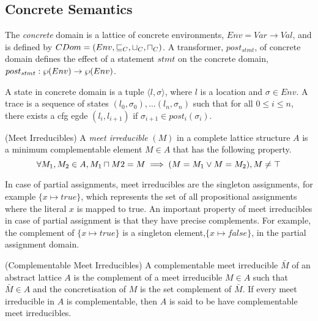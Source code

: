 \subsection{Concrete Semantics}
The {\em concrete} domain is a lattice 
of concrete environments, $Env = Var \rightarrow Val$, and is 
defined by $CDom = (Env, \sqsubseteq_{C}, \sqcup_{C}, \sqcap_{C})$.
A transformer, $post_{stmt}$, of concrete domain defines 
the effect of a statement $stmt$ on the concrete domain, 
$post_{stmt} : \wp(Env) \rightarrow \wp(Env)$.  

A state in concrete domain is a tuple $\langle l, \sigma \rangle$, 
where $l$ is a location and $\sigma \in Env$.  A trace is a sequence 
of states $(l_0, \sigma_0), \ldots (l_n, \sigma_n)$ such that for all 
$0 \leq i \leq n$, there exists a cfg egde $(l_{i}, l_{i+1})$ 
if $\sigma_{i+1} \in post_{i}(\sigma_{i})$. 
 
\begin{definition}{(Meet Irreducibles)} A {\em meet irreducible} $(M)$ 
in a complete lattice structure $A$ is a minimum complementable element 
$M \in A$ that has the following property.
\[\forall M_1, M_2 \in A, M_1 \sqcap M2 = M \implies (M = M_1 \lor M = M_2), M \neq \top \]  
\end{definition}

In case of partial assignments, meet irreducibles are the singleton
assignments, for example $\{x \mapsto true \}$, which represents the set 
of all propositional assignments where the literal $x$ is mapped to true.  
An important property of meet irreducibles in case of partial assignment is that 
they have precise complements.  For example, the complement of $\{x \mapsto true \}$
is a singleton element,$\{x \mapsto false \}$, in the partial assignment domain. 

\begin{definition}{(Complementable Meet Irreducibles)} A complementable meet
irreducible $\bar{M}$ of an abstract lattice $A$ is the complement of a meet 
irreducible $M \in A$ such that $\bar{M} \in A$ and the concretisation of $M$ 
is the set complement of $\bar{M}$.  If every meet irreducible in $A$ is
complementable, then $A$ is said to be have complementable meet irreducibles.  
\end{definition}

